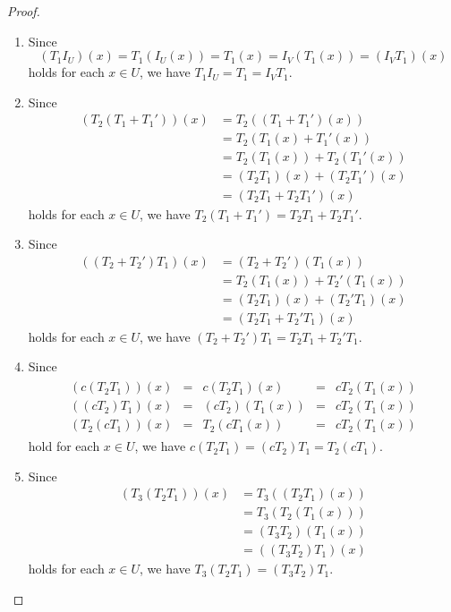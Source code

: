 \begin{proof}
  \leavevmode
  \begin{enumerate}
    \item Since
    \begin{equation*}
      (T_1I_U)(x) = T_1(I_U(x)) = T_1(x) = I_V(T_1(x)) = (I_VT_1)(x)
    \end{equation*}
    holds for each $x \in U$, we have $T_1I_U = T_1 = I_VT_1$.
    
    \item Since
    \begin{align*}
      (T_2(T_1 + T_1'))(x)
      &= T_2((T_1 + T_1')(x)) \tag{composition} \\
      &= T_2(T_1(x) + T_1'(x)) \tag{addition} \\
      &= T_2(T_1(x)) + T_2(T_1'(x)) \tag{linearity} \\
      &= (T_2T_1)(x) + (T_2T_1')(x) \tag{composition}\\
      &= (T_2T_1 + T_2T_1')(x) \tag{addition}
    \end{align*}
    holds for each $x \in U$, we have $T_2(T_1 + T_1') = T_2T_1 + T_2T_1'$.

    \item Since
    \begin{align*}
      ((T_2 + T_2')T_1)(x)
      &= (T_2 + T_2')(T_1(x)) \tag{composition} \\
      &= T_2(T_1(x)) + T_2'(T_1(x)) \tag{addition} \\
      &= (T_2T_1)(x) + (T_2'T_1)(x) \tag{composition} \\
      &= (T_2T_1 + T_2'T_1)(x) \tag{addition}
    \end{align*}
    holds for each $x \in U$, we have $(T_2 + T_2')T_1 = T_2T_1 + T_2'T_1$.

    \item Since
    \begin{align*}
      \begin{array}{ccccc}
        (c(T_2T_1))(x) &=& c(T_2T_1)(x) &=& cT_2(T_1(x)) \\[.5em]
        ((cT_2)T_1)(x) &=& (cT_2)(T_1(x)) &=& cT_2(T_1(x)) \\[.5em]
        (T_2(cT_1))(x) &=& T_2(cT_1(x)) &=& cT_2(T_1(x))
      \end{array}
    \end{align*}
    hold for each $x \in U$, we have $c(T_2T_1) = (cT_2)T_1 = T_2(cT_1)$.
    
    \item Since
    \begin{align*}
      (T_3(T_2T_1))(x)
      &= T_3((T_2T_1)(x)) \tag{composition of $T_3$ and $T_2T_1$} \\
      &= T_3(T_2(T_1(x))) \tag{composition of $T_2$ and $T_1$} \\
      &= (T_3T_2)(T_1(x)) \tag{composition of $T_3$ and $T_2$} \\
      &= ((T_3T_2)T_1)(x) \tag{composition of $T_3T_2$ and $T_1$}
    \end{align*}
    holds for each $x \in U$, we have $T_3(T_2T_1) = (T_3T_2)T_1$.
    \qedhere
  \end{enumerate}
\end{proof}

